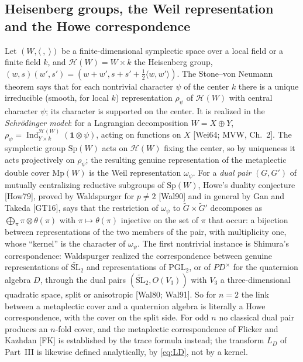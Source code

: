 \documentclass[11pt]{article}
\newcommand{\Ind}{\operatorname{Ind}}
\theoremstyle{plain}
\theoremstyle{definition}
\begin{document}
\subsection{Heisenberg groups, the Weil representation and the Howe correspondence}\label{subsec:howe}
Let $(W,\langle\ ,\ \rangle)$ be a finite-dimensional symplectic space
over a local field or a finite field $k$, and $\mathcal H(W)=W\times k$
the Heisenberg group, $(w,s)(w',s')=(w+w',s+s'+\tfrac12\langle w,w'\rangle)$.
The Stone--von Neumann theorem says that for each nontrivial character
$\psi$ of the center $k$ there is a unique irreducible (smooth, for local
$k$) representation $\rho_\psi$ of $\mathcal H(W)$ with central character
$\psi$; its character is supported on the center.  It is realized in the
\emph{Schr\"odinger model}: for a Lagrangian decomposition $W=X\oplus Y$,
$\rho_\psi=\Ind_{Y\times k}^{\mathcal H(W)}(\mathbf1\otimes\psi)$, acting on
functions on $X$ [Wei64; MVW, Ch.~2].  The symplectic group $\mathrm{Sp}(W)$
acts on $\mathcal H(W)$ fixing the center, so by uniqueness it acts
projectively on $\rho_\psi$; the resulting genuine representation of the
metaplectic double cover $\mathrm{Mp}(W)$ is the Weil representation
$\omega_\psi$.  For a \emph{dual pair} $(G,G')$ of mutually
centralizing reductive subgroups of $\mathrm{Sp}(W)$, Howe's duality
conjecture [How79], proved by Waldspurger for $p\ne2$ [Wal90] and in
general by Gan and Takeda [GT16], says that the restriction of
$\omega_\psi$ to $\tilde G\times\tilde G'$ decomposes as
$\bigoplus_\pi\pi\otimes\theta(\pi)$ with $\pi\mapsto\theta(\pi)$
injective on the set of $\pi$ that occur: a bijection between
representations of the two members of the pair, with multiplicity one,
whose ``kernel'' is the character of $\omega_\psi$.  The first
nontrivial instance is Shimura's correspondence: Waldspurger realized
the correspondence between genuine representations of
$\widetilde{\mathrm{SL}}_2$ and representations of $\mathrm{PGL}_2$,
or of $PD^\times$ for the quaternion algebra $D$, through the dual pairs
$(\widetilde{\mathrm{SL}}_2,O(V_3))$ with $V_3$ a three-dimensional
quadratic space, split or anisotropic [Wal80; Wal91].  So for $n=2$ the
link between a metaplectic cover and a quaternion algebra is literally
a Howe correspondence, with the cover on the split side.  For odd $n$
no classical dual pair produces an $n$-fold cover, and the metaplectic
correspondence of Flicker and Kazhdan [FK] is established by the trace
formula instead; the transform $L_D$ of Part~III is likewise defined
analytically, by \eqref{eq:LD}, not by a kernel.
\end{document}
